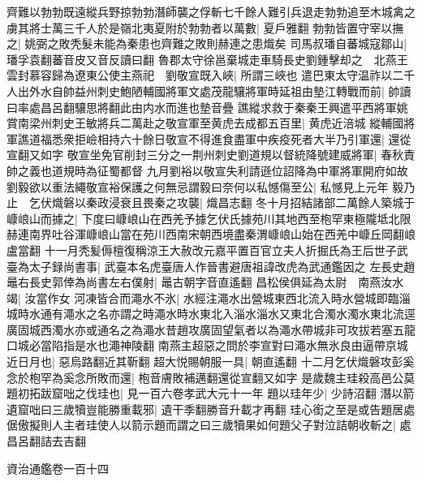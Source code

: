 齊難以勃勃既遠縱兵野掠勃勃潛師襲之俘斬七千餘人難引兵退走勃勃追至木城禽之虜其將士萬三千人於是嶺北夷夏附於勃勃者以萬數|{
	夏戶雅翻}
勃勃皆置守宰以撫之|{
	姚弼之敗秃髮未能為秦患也齊難之敗則赫連之患熾矣}
司馬叔璠自蕃城寇鄒山|{
	璠孚袁翻蕃音皮又音反讀曰翻}
魯郡太守徐邕棄城走車騎長史劉鍾擊却之　北燕王雲封慕容歸為遼東公使主燕祀　劉敬宣既入峽|{
	所謂三峽也}
遣巴東太守温祚以二千人出外水自帥益州刺史鮑陋輔國將軍文處茂龍驤將軍時延祖由墊江轉戰而前|{
	帥讀曰率處昌呂翻驤思將翻此由内水而進也墊音疊}
譙縱求救于秦秦王興遣平西將軍姚賞南梁州刺史王敏將兵二萬赴之敬宣軍至黄虎去成都五百里|{
	黄虎近涪城}
縱輔國將軍譙道福悉衆拒嶮相持六十餘日敬宣不得進食盡軍中疾疫死者大半乃引軍還|{
	還從宣翻又如字}
敬宣坐免官削封三分之一荆州刺史劉道規以督統降號建威將軍|{
	春秋責帥之義也道規時為征蜀都督}
九月劉裕以敬宣失利請遜位詔降為中軍將軍開府如故劉毅欲以重法繩敬宣裕保護之何無忌謂毅曰奈何以私憾傷至公|{
	私憾見上元年}
毅乃止　乞伏熾磐以秦政浸衰且畏秦之攻襲|{
	熾昌志翻}
冬十月招結諸部二萬餘人築城于嵻㟍山而據之|{
	下度曰嵻㟍山在西羌予據乞伏氏據苑川其地西至枹罕東極隴坻北限赫連南界吐谷渾嵻㟍山當在苑川西南宋朝西境盡秦渭嵻㟍山始在西羌中嵻丘岡翻㟍盧當翻}
十一月秃髪傉檀復稱涼王大赦改元嘉平置百官立夫人折掘氏為王后世子武臺為太子録尚書事|{
	武臺本名虎臺唐人作晉書避唐祖諱改虎為武通鑑因之}
左長史趙鼂右長史郭倖為尚書左右僕射|{
	鼂古朝字音直遙翻}
昌松侯俱延為太尉　南燕汝水竭|{
	汝當作女}
河凍皆合而澠水不氷|{
	水經注澠水出營城東西北流入時水營城即臨淄城時水通有澠水之名亦謂之時澠水時水東北入淄水淄水又東北合濁水濁水東北流逕廣固城西濁水亦或通名之為澠水昔趙攻廣固望氣者以為澠水帶城非可攻拔若塞五龍口城必當陷指是水也澠神陵翻}
南燕主超惡之問於李宣對曰澠水無氷良由逼帶京城近日月也|{
	惡烏路翻近其靳翻}
超大悦賜朝服一具|{
	朝直遙翻}
十二月乞伏熾磐攻彭奚念於枹罕為奚念所敗而還|{
	枹音膚敗補邁翻還從宣翻又如字}
是歲魏主珪殺高邑公莫題初拓跋窟咄之伐珪也|{
	見一百六卷孝武大元十一年}
題以珪年少|{
	少詩沼翻}
潛以箭遺窟咄曰三歲犢豈能勝重載邪|{
	遺干季翻勝音升載才再翻}
珪心銜之至是或告題居處倨傲擬則人主者珪使人以箭示題而謂之曰三歲犢果如何題父子對泣詰朝收斬之|{
	處昌呂翻詰去吉翻}


資治通鑑卷一百十四
